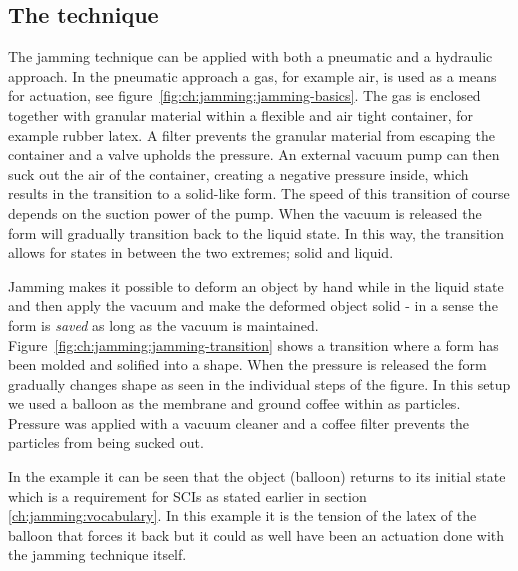 

\subsection{The technique}
\label{ch:jamming:technique}

The jamming technique can be applied with both a pneumatic and a hydraulic approach.
In the pneumatic approach a gas, for example air, is used as a means for actuation, see figure~\ref{fig:ch:jamming:jamming-basics}.
The gas is enclosed together with granular material within a flexible and air tight container, for example rubber latex. 
A filter prevents the granular material from escaping the container and a valve upholds the pressure.
An external vacuum pump can then suck out the air of the container, creating a negative pressure inside, which results in the transition to a solid-like form. 
The speed of this transition of course depends on the suction power of the pump.
When the vacuum is released the form will gradually transition back to the liquid state. 
In this way, the transition allows for states in between the two extremes; solid and liquid.

Jamming makes it possible to deform an object by hand while in the liquid state and then apply the vacuum and make the deformed object solid - in a sense the form is \emph{saved} as long as the vacuum is maintained.
Figure~\ref{fig:ch:jamming:jamming-transition} shows a transition where a form has been molded and solified into a shape.
When the pressure is released the form gradually changes shape as seen in the individual steps of the figure.
In this setup we used a balloon as the membrane and ground coffee within as particles.
Pressure was applied with a vacuum cleaner and a coffee filter prevents the particles from being sucked out.

In the example it can be seen that the object (balloon) returns to its initial state which is a requirement for SCIs as stated earlier in section \ref{ch:jamming:vocabulary}.
In this example it is the tension of the latex of the balloon that forces it back but it could as well have been an actuation done with the jamming technique itself. 

